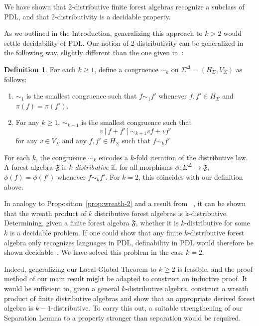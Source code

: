 \documentclass[sigplan,9pt]{acmart}\settopmatter{printfolios=true,printccs=false,printacmref=false}
\newcounter{thm}
\newcounter{theorem}
\theoremstyle{definition}
\newtheorem{defin}[thm]{Definition}
\newcommand{\Ff}[0]{{\mathfrak{F}}}
\begin{document}
We have shown that 2-distributive finite forest algebras recognize a subclass of PDL, and that 2-distributivity is a decidable property.

As we outlined in the Introduction, generalizing this approach to $k > 2$ would settle decidability of PDL.
Our notion of 2-distributivity can be generalized in the following way, slightly different than the one given in~\cite{straubing-new-2013}:


\begin{defin}
For each $k \geq 1$, define a congruence $\sim_k$ on $\Sigma^\Delta = (H_\Sigma, V_\Sigma)$ as follows:
\begin{enumerate}
\item $\sim_1$ is the smallest congruence such that $f \sim_1 f'$ whenever $f, f' \in H_\Sigma$ and $\pi(f) = \pi(f')$.
\item For any $k \geq 1$, $\sim_{k+1}$ is the smallest congruence such that \[v[f+f'] \sim_{k+1} vf + vf'\] for any $v \in V_\Sigma$ and any $f, f' \in H_\Sigma$ such that $f \sim_k f'$.
\end{enumerate}
\end{defin}
For each $k$, the congruence $\sim_k$ encodes a $k$-fold iteration of the distributive law.
A forest algebra $\Ff$ is \emph{$k$-distributive} if, for all morphisms $\phi : \Sigma^\Delta \rightarrow \Ff$, $\phi(f) = \phi(f')$ whenever $f \sim_k f'$.
For $k = 2$, this coincides with our definition above.

In analogy to Proposition~\ref{prop:wreath-2} and a result from ~\cite{straubing-new-2013}, it can be shown that the wreath product of $k$ distributive forest algebras is k-distributive.
Determining, given a finite forest algebra $\Ff$, whether it is $k$-distributive for some $k$ is a decidable problem.
If one could show that any finite $k$-distributive forest algebra only recognizes languages in PDL, definability in PDL would therefore be shown decidable~\cite{straubing-new-2013}.
We have solved this problem in the case $k=2$.

Indeed, generalizing our Local-Global Theorem to $k \geq 2$ is feasible, and the proof method of our main result might be adapted to construct an inductive proof.
It would be sufficient to, given a general $k$-distributive algebra, construct a wreath product of finite distributive algebras and show that an appropriate derived forest algebra is $k-1$-distributive. 
To carry this out, a suitable strengthening of our Separation Lemma to a property stronger than separation would be required.
\end{document}
